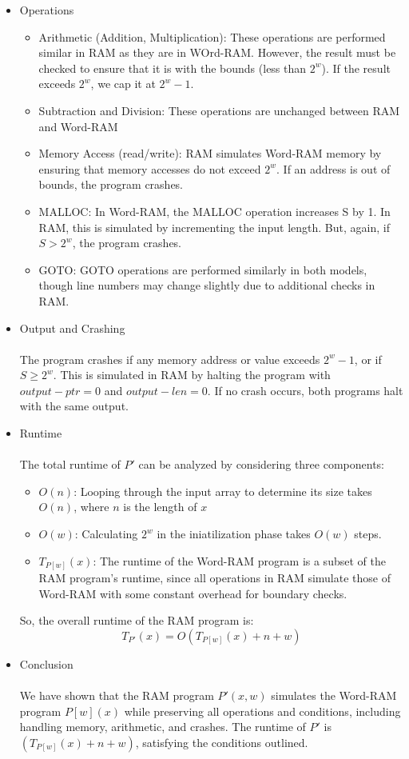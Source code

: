 \documentclass[11pt]{article}
\begin{document}
\begin{enumerate}
\begin{itemize}
    \item Operations
    \begin{itemize}
        \item Arithmetic (Addition, Multiplication): These operations are performed similar in RAM as they are in WOrd-RAM. However, the result must be checked to ensure that it is with the bounds (less than $2^w$). If the result exceeds $2^w$, we cap it at $2^w-1$.
        \item Subtraction and Division: These operations are unchanged between RAM and Word-RAM
        \item Memory Access (read/write): RAM simulates Word-RAM memory by ensuring that memory accesses do not exceed $2^w$. If an address is out of bounds, the program crashes.
        \item MALLOC: In Word-RAM, the MALLOC operation increases S by 1. In RAM, this is simulated by incrementing the input length. But, again, if $S > 2^w$, the program crashes.
        \item GOTO: GOTO operations are performed similarly in both models, though line numbers may change slightly due to additional checks in RAM.
        
    \end{itemize}
    \item Output and Crashing
    \\\\ The program crashes if any memory address or value exceeds $2^w-1$, or if $S \geq 2^w$. This is simulated in RAM by halting the program with $output-ptr = 0$ and $output-len = 0$. If no crash occurs, both programs halt with the same output.
    \item Runtime
    \\\\ The total runtime of $P'$ can be analyzed by considering three components:
    \begin{itemize}
        \item $O(n)$: Looping through the input array to determine its size takes $O(n)$, where $n$ is the length of $x$
        \item $O(w)$: Calculating $2^w$ in the iniatilization phase takes $O(w)$ steps.
        \item $T_{P[w]}(x)$: The runtime of the Word-RAM program is a subset of the RAM program's runtime, since all operations in RAM simulate those of Word-RAM with some constant overhead for boundary checks. 
    \end{itemize}
    So, the overall runtime of the RAM program is:
    \begin{equation*}
        T_{P'}(x) = O(T_{P[w]}(x) + n + w)
    \end{equation*}
    \item Conclusion
    \\\\ We have shown that the RAM program $P'(x,w)$ simulates the Word-RAM program $P[w](x)$ while preserving all operations and conditions, including handling memory, arithmetic, and crashes. The runtime of $P'$ is $(T_{P[w]}(x) + n + w)$, satisfying the conditions outlined. 
\end{itemize}


\end{enumerate}
\end{document}
